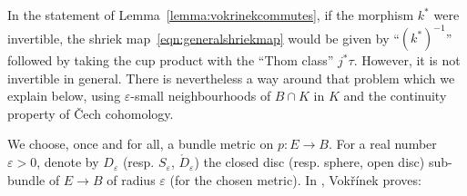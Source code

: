 \documentclass[a4paper]{amsart}
\theoremstyle{plain}
\theoremstyle{definition}
\renewcommand{\epsilon}{\varepsilon}
\begin{document}
In the statement of Lemma~\ref{lemma:vokrinekcommutes}, if the morphism $k^*$ were invertible, the shriek map~\eqref{eqn:generalshriekmap} would be given by ``$(k^*)^{-1}$'' followed by taking the cup product with the ``Thom class'' $j^*\tau$. However, it is not invertible in general. There is nevertheless a way around that problem which we explain below, using $\varepsilon$-small neighbourhoods of $B \cap K$ in $K$ and the continuity property of \v{C}ech cohomology.

\bigskip


We choose, once and for all, a bundle metric on $p \colon E \to B$. For a real number $\varepsilon > 0$, denote by $D_\varepsilon$ (resp. $S_\varepsilon$, $\mathring{D}_\varepsilon$) the closed disc (resp. sphere, open disc) sub-bundle of $E \to B$ of radius $\epsilon$ (for the chosen metric). In \cite[Lemma D.2]{vokrinek_generalization_2007}, Vok\v{r}\'{i}nek proves:
\end{document}
